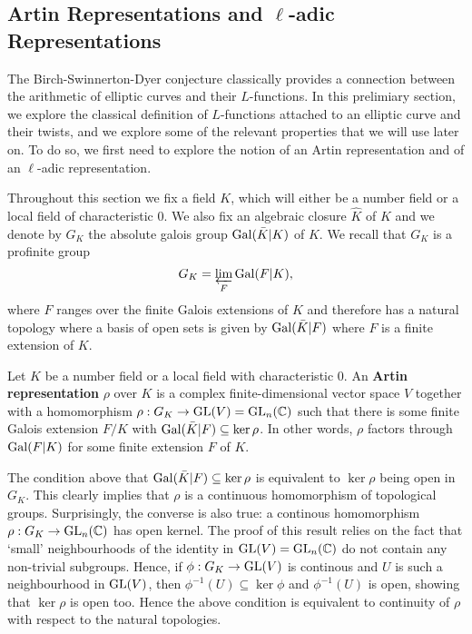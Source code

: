 \subsection{Artin Representations and  \texorpdfstring{$\ell$}{TEXT}-adic Representations}

\cite[Just trying]{BH1}

The Birch-Swinnerton-Dyer conjecture classically provides a connection between the arithmetic of elliptic curves and their $L$-functions. In this prelimiary section, we explore the classical definition of $L$-functions attached to an elliptic curve and their twists, and we explore some of the relevant properties that we will use later on. To do so, we first need to explore the notion of an Artin representation and of an $\ell$-adic representation. 

Throughout this section we fix a field $K$, which will either be a number field or a local field of characteristic $0$. We also fix an algebraic closure $\hat{K}$ of $K$ and we denote by $G_K$ the absolute galois group $\mathrm{Gal}(\bar{K}|K)$ of $K$. We recall that $G_K$ is a profinite group
$$G_K=\varprojlim_{F}\mathrm{Gal}(F|K),$$
where $F$ ranges over the finite Galois extensions of $K$ and therefore has a natural topology where a basis of open sets is given by $\mathrm{Gal}(\bar{K}|F)$ where $F$ is a finite extension of $K$.

\begin{defn}
    Let $K$ be a number field or a local field with characteristic $0$. An \textbf{Artin representation} $\rho$ over $K$ is a complex finite-dimensional vector space $V$ together with a homomorphism $\rho:G_K\to\mathrm{GL}(V)=\mathrm{GL}_n(\mathbb{C})$ such that there is some finite Galois extension $F/K$ with $\mathrm{Gal}(\bar{K}|F)\subseteq\ker\rho$. In other words, $\rho$ factors through $\mathrm{Gal}(F|K)$ for some finite extension $F$ of $K$.
\end{defn}

\begin{rem}
    The condition above that $\mathrm{Gal}(\bar{K}|F)\subseteq\ker\rho$ is equivalent to $\ker\rho$ being open in $G_K$. This clearly implies that $\rho$ is a continuous homomorphism of topological groups. Surprisingly, the converse is also true: a continous homomorphism $\rho:G_K\to\mathrm{GL}_n(\mathbb{C})$ has open kernel. The proof of this result relies on the fact that `small' neighbourhoods of the identity in $\mathrm{GL}(V)=\mathrm{GL}_n(\mathbb{C})$ do not contain any non-trivial subgroups. Hence, if $\phi:G_K\to\mathrm{GL}(V)$ is continous and $U$ is such a neighbourhood in $\mathrm{GL}(V)$, then $\phi^{-1}(U)\subseteq\ker\phi$ and $\phi^{-1}(U)$ is open, showing that $\ker\rho$ is open too. Hence the above condition is equivalent to continuity of $\rho$ with respect to the natural topologies.
\end{rem}

